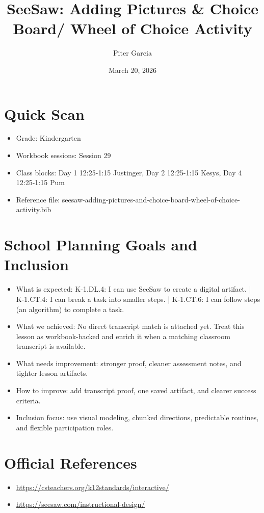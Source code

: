 \documentclass[11pt]{article}
\title{SeeSaw: Adding Pictures & Choice Board/ Wheel of Choice Activity}
\author{Piter Garcia}
\date{March 20, 2026}
\begin{document}
    \maketitle
    \section*{Quick Scan}
    \begin{itemize}[leftmargin=*]
    \item Grade: Kindergarten
    \item Workbook sessions: Session 29
    \item Class blocks: Day 1 12:25-1:15 Justinger, Day 2 12:25-1:15 Kesys, Day 4 12:25-1:15 Pum
    \item Reference file: seesaw-adding-pictures-and-choice-board-wheel-of-choice-activity.bib
    \end{itemize}
    \section*{School Planning Goals and Inclusion}
    \begin{itemize}[leftmargin=*]
    \item What is expected: K-1.DL.4: I can use SeeSaw to create a digital artifact. | K-1.CT.4: I can break a task into smaller steps. | K-1.CT.6: I can follow steps (an algorithm) to complete a task.
    \item What we achieved: No direct transcript match is attached yet. Treat this lesson as workbook-backed and enrich it when a matching classroom transcript is available.
    \item What needs improvement: stronger proof, cleaner assessment notes, and tighter lesson artifacts.
    \item How to improve: add transcript proof, one saved artifact, and clearer success criteria.
    \item Inclusion focus: use visual modeling, chunked directions, predictable routines, and flexible participation roles.
    \end{itemize}
    \section*{Official References}
    \begin{itemize}[leftmargin=*]
    \item \url{https://csteachers.org/k12standards/interactive/}
\item \url{https://seesaw.com/instructional-design/}

    \end{itemize}
    
\end{document}
